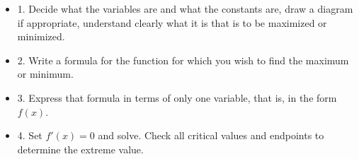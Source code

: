 \label{exam:sand and road}


\begin{itemize} %

\item{1.} Decide what the variables are and what the constants are, draw a
diagram if appropriate, understand clearly what it is that is to be
maximized or minimized.

\item{2.} Write a formula for the function for which you wish to find 
the maximum or minimum.

\item{3.} Express that formula in terms of only one variable, that is, in
the form $f(x)$.

\item{4.} Set $f'(x)=0$ and solve. Check all critical values and
  endpoints to determine the extreme value.

\end{itemize}

